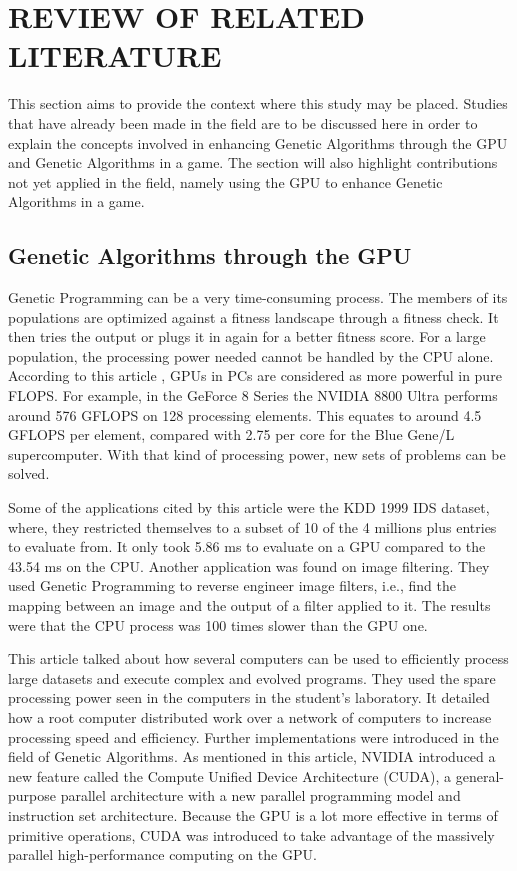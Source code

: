 \chapter{REVIEW OF RELATED LITERATURE}

This section aims to provide the context where this study may be placed. 
Studies that have already been made in the field are to be discussed here in order to 
explain the concepts involved in enhancing Genetic Algorithms through the GPU and 
Genetic Algorithms in a game. The section will also highlight contributions not yet 
applied in the field, namely using the GPU to enhance Genetic Algorithms in a game.

\section{Genetic Algorithms through the GPU}

Genetic Programming can be a very time-consuming process.  The members of its populations are optimized against a fitness landscape through a fitness check.  
It then tries the output or plugs it in again for a better fitness score. For a large population, the processing power needed cannot be handled by the CPU alone.  
According to this article , GPUs in PCs are considered as more powerful in pure FLOPS\cite{Banzhaf09}.  For example, in the GeForce 8 Series the NVIDIA 8800 Ultra performs around 576 GFLOPS 
on 128 processing elements.  This equates to around 4.5 GFLOPS per element, compared with 2.75 per core for the Blue Gene/L supercomputer.  With that kind of processing power, 
new sets of problems can be solved.  

Some of the applications cited by this article were the KDD 1999 IDS dataset, where, they restricted themselves to a subset of 10%
of the 4 millions plus entries to evaluate from\cite{Banzhaf09}.  It only took 5.86 ms to evaluate on a GPU compared to the 43.54 ms on the CPU.  Another application was found on image filtering.  
They used Genetic Programming to reverse engineer image filters, i.e., find the mapping between an image and the output of a filter applied to it.  The results were that the CPU process 
was 100 times slower than the GPU one.  

This article talked about how several computers can be used to efficiently process large datasets and execute complex and evolved programs\cite{Harding09}.  
They used the spare processing power seen in the computers in the student's laboratory.  It detailed how a root computer distributed work over a network of computers to increase processing speed and efficiency.
Further implementations were introduced in the field of Genetic Algorithms.  As mentioned in this article, NVIDIA introduced a new feature called the Compute Unified Device Architecture (CUDA), 
a general-purpose parallel architecture with a new parallel programming model and instruction set architecture\cite{Zhang09}.  Because the GPU is a lot more effective in terms of primitive operations, 
CUDA was introduced to take advantage of the massively parallel high-performance computing on the GPU.  

